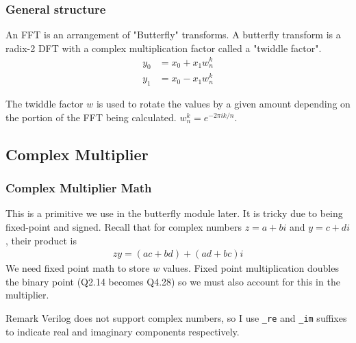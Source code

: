 \documentclass{beamer}
\begin{document}
\begin{frame}
	\frametitle{General structure}
	An FFT is an arrangement of "Butterfly" transforms.
	A butterfly transform is a radix-2 DFT with a complex multiplication factor called
	a "twiddle factor".
	\begin{align*}
		y_0 &= x_0 + x_1 w_n^k \\
		y_1 &= x_0 - x_1 w_n^k
	\end{align*}
	\begin{figure}
		\centering
	\end{figure}
	The twiddle factor $w$ is used to rotate the values by a given amount depending on the
	portion of the FFT being calculated. $w_n^k = e^{-2\pi i k / n}$.
\end{frame}

\subsection{Complex Multiplier}
\begin{frame}
	\frametitle{Complex Multiplier Math}
	This is a primitive we use in the butterfly module later. It is tricky
	due to being fixed-point and signed. \pause Recall that for complex
	numbers $z = a+bi$ and $y = c + di$, their product is
	\begin{align*}
		z y = (ac + bd) + (ad + bc)i
	\end{align*}
	\pause
	We need fixed point math to store $w$ values. Fixed point multiplication doubles
	the binary point (Q2.14 becomes Q4.28) so we must also account for this in the multiplier.

	\begin{block}{Remark}
		Verilog does not support complex numbers, so I use \texttt{\_re} and
		\texttt{\_im} suffixes to indicate real and imaginary components 
		respectively.
	\end{block}
\end{frame}
\end{document}
